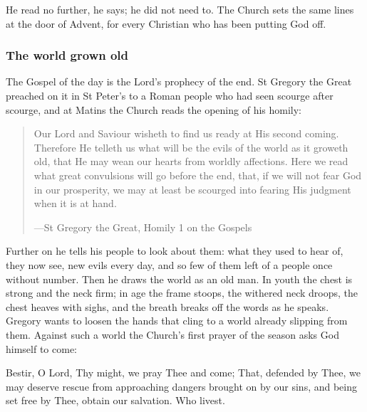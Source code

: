 He read no further, he says; he did not need to. The Church sets the same lines
at the door of Advent, for every Christian who has been putting God off.

\subsubsection*{The world grown old}

The Gospel of the day is the Lord's prophecy of the end. St Gregory the Great
preached on it in St Peter's to a Roman people who had seen scourge after
scourge, and at Matins the Church reads the opening of his homily:

\begin{quote}
Our Lord and Saviour wisheth to find us ready at His second coming. Therefore He
telleth us what will be the evils of the world as it groweth old, that He may
wean our hearts from worldly affections. Here we read what great convulsions
will go before the end, that, if we will not fear God in our prosperity, we may
at least be scourged into fearing His judgment when it is at hand.\par
{\smallskip\noindent\small ---St Gregory the Great, Homily 1 on the Gospels\par}
\end{quote}

Further on he tells his people to look about them: what they used to hear of,
they now see, new evils every day, and so few of them left of a people once
without number. Then he draws the world as an old man. In youth the chest is
strong and the neck firm; in age the frame stoops, the withered neck droops,
the chest heaves with sighs, and the breath breaks off the words as he speaks.
Gregory wants to loosen the hands that cling to a world already slipping from
them. Against such a world the Church's first prayer of the season asks God
himself to come:

\begin{studyframe}
\medskip

Bestir, O Lord, Thy might, we pray Thee and come; That, defended by Thee, we may
deserve rescue from approaching dangers brought on by our sins, and being set
free by Thee, obtain our salvation. Who livest.\par
\end{studyframe}

